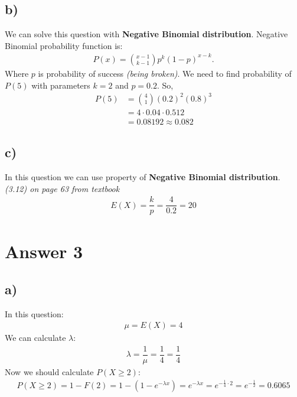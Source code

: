 \documentclass[12pt]{article}
\begin{document}
\subsection*{b)}
We can solve this question with \textbf{Negative Binomial distribution}. Negative Binomial probability function is:
\begin{equation}
    \begin{split}
        P(x) = \binom{x-1}{k-1} p^k (1-p)^{x-k}.
    \end{split}
\end{equation}
Where $p$ is probability of success \textit{(being broken)}.
We need to find probability of $P(5)$ with parameters $k = 2$ and $p = 0.2$. So,
\begin{equation}
    \begin{split}
        P(5) &= \binom{4}{1} (0.2)^2 (0.8)^3\\
             &= 4 \cdot 0.04 \cdot 0.512 \\
             &= 0.08192 \approx 0.082
    \end{split}
\end{equation}
\subsection*{c)}
In this question we can use property of \textbf{Negative Binomial distribution}. \textit{(3.12) on page 63 from textbook}
\begin{equation}
    \begin{split}
        E(X) = \dfrac{k}{p} = \dfrac{4}{0.2} = 20
    \end{split}
\end{equation}
\section*{Answer 3}
\subsection*{a)}
In this question: 
\begin{equation}
    \begin{split}
        \mu = E(X) = 4
    \end{split}
\end{equation}
We can calculate $\lambda$:
\begin{equation}
    \begin{split}
        \lambda = \dfrac{1}{\mu} = \dfrac{1}{4} = \dfrac{1}{4}
    \end{split}
\end{equation}
Now we should calculate $P(X\geq2)$:
\begin{equation}
    \begin{split}
        P(X\geq2)= 1 - F(2) = 1 - (1 -e^{-\lambda x}) = e^{-\lambda x} = e^{-\frac{1}{4} \cdot 2} = e^{-\frac{1}{2}} = 0.6065
    \end{split}
\end{equation}
\end{document}
